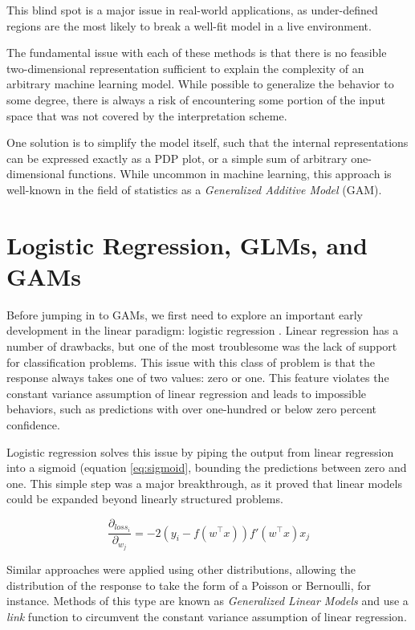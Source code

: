 This blind spot is a major issue in real-world applications, as under-defined regions are the most likely to break a well-fit model in a live environment. 

The fundamental issue with each of these methods is that there is no feasible two-dimensional representation sufficient to explain the complexity of an arbitrary machine learning model. While possible to generalize the behavior to some degree, there is always a risk of encountering some portion of the input space that was not covered by the interpretation scheme. 

One solution is to simplify the model itself, such that the internal representations can be expressed exactly as a PDP plot, or a simple sum of arbitrary one-dimensional functions. While uncommon in machine learning, this approach is well-known in the field of statistics as a \textit{Generalized Additive Model} (GAM). 

\section{Logistic Regression, GLMs, and GAMs}

Before jumping in to GAMs, we first need to explore an important early development in the linear paradigm: logistic regression \citep{Nelder1972GeneralizedModels}. Linear regression has a number of drawbacks, but one of the most troublesome was the lack of support for classification problems. This issue with this class of problem is that the response always takes one of two values: zero or one. This feature violates the constant variance assumption of linear regression and leads to impossible behaviors, such as predictions with over one-hundred or below zero percent confidence. 

Logistic regression solves this issue by piping the output from linear regression into a sigmoid (equation \ref{eq:sigmoid}, bounding the predictions between zero and one. This simple step was a major breakthrough, as it proved that linear models could be expanded beyond linearly structured problems. 

\begin{equation}
    \label{eq:sigmoid}
    \frac{\partial_{loss_i}}{\partial_{w_j}} = -2 (y_i - f(w^\top x)) f'(w^\top x) x_j
\end{equation}

Similar approaches were applied using other distributions, allowing the distribution of the response to take the form of a Poisson or Bernoulli, for instance. Methods of this type are known as \textit{Generalized Linear Models} \citep{Nelder1972GeneralizedModels} and use a \textit{link} function to circumvent the constant variance assumption of linear regression. 

